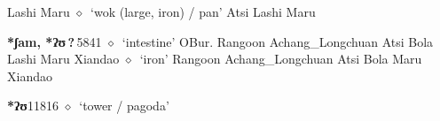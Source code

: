 \begin{list}{}{\leftmargin=1.5em \itemindent=-1.5em}
\hspace{1ex}
         Lashi 
\hspace{1ex}
         Maru 
\hspace{1ex}
         $\diamond$~`wok (large, iron) / pan'
         Atsi 
\hspace{1ex}
         Lashi 
\hspace{1ex}
         Maru 
  \item {\footnotesize \textbf{*ʃam, *ʔʊ\,?\,}}{\tiny 5841}
\hspace{1ex}
         $\diamond$~`intestine'
         OBur. 
\hspace{1ex}
         Rangoon 
\hspace{1ex}
         Achang\_Longchuan 
\hspace{1ex}
         Atsi 
\hspace{1ex}
         Bola 
\hspace{1ex}
         Lashi 
\hspace{1ex}
         Maru 
\hspace{1ex}
         Xiandao 
\hspace{1ex}
         $\diamond$~`iron'
         Rangoon 
\hspace{1ex}
         Achang\_Longchuan 
\hspace{1ex}
         Atsi 
\hspace{1ex}
         Bola 
\hspace{1ex}
         Maru 
\hspace{1ex}
         Xiandao 
  \item {\footnotesize \textbf{*ʔʊ}}{\tiny 11816}
\hspace{1ex}
         $\diamond$~`tower / pagoda'

\end{list}

